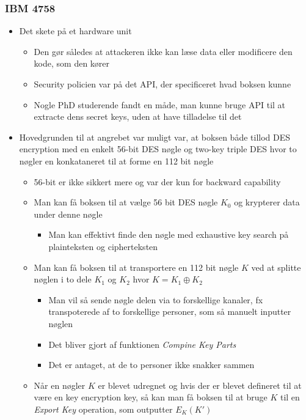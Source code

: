 \documentclass[a4, english]{article}
\begin{document}
\subsubsection{IBM 4758}
\begin{itemize}
	\item Det skete på et hardware unit 
  \begin{itemize}
  	\item Den gør således at attackeren ikke kan læse data eller modificere den kode, som den kører 
    \item Security policien var på det API, der specificeret hvad boksen kunne   
    \item Nogle PhD studerende fandt en måde, man kunne bruge API til at extracte dens secret keys, uden at have tilladelse til det 
    \end{itemize}
  \item Hovedgrunden til at angrebet var muligt var, at boksen både tillod DES encryption med en enkelt 56-bit DES nøgle og two-key triple DES hvor to nøgler en konkataneret til at forme en 112 bit nøgle  
  \begin{itemize}
  	\item 56-bit er ikke sikkert mere og var der kun for backward capability 
    \item Man kan få boksen til at vælge 56 bit DES nøgle $K_0$ og krypterer data under denne nøgle 
    \begin{itemize}
    	\item Man kan effektivt finde den nøgle med exhaustive key search på plainteksten og cipherteksten
    \end{itemize}
    \item Man kan få boksen til at transportere en 112 bit nøgle $K$ ved at splitte nøglen i to dele $K_1$ og $K_2$ hvor $K = K_1 \oplus K_2$ 
    \begin{itemize}
    	\item Man vil så sende nøgle delen via to forskellige kanaler, fx transpoterede af to forskellige personer, som så manuelt inputter nøglen
      \item Det bliver gjort af funktionen \textit{Compine Key Parts} 
      \item Det er antaget, at de to personer ikke snakker sammen
    \end{itemize}
    \item Når en nøgler $K$ er blevet udregnet og hvis der er blevet defineret til at være en key encryption key, så kan man få boksen til at bruge $K$ til en \textit{Export Key} operation, som outputter $E_K(K')$ 

\end{itemize}
\end{itemize}
\end{document}
